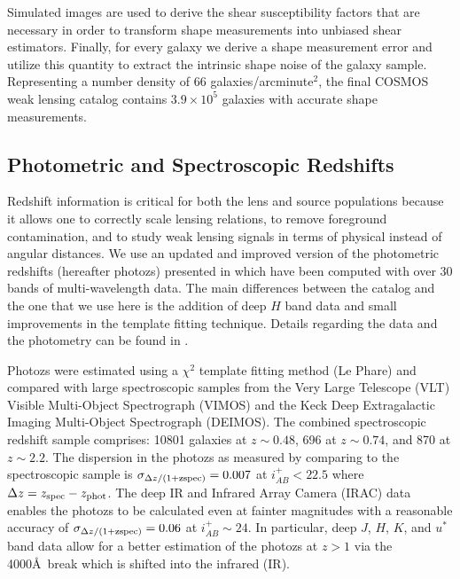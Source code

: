 \documentclass[12pt]{emulateapj}
\begin{document}
Simulated images are used to derive the shear susceptibility factors
that are necessary in order to transform shape measurements into
unbiased shear estimators. Finally, for every galaxy we derive a shape
measurement error and utilize this quantity to extract the intrinsic
shape noise of the galaxy sample.  Representing a number density of
$66$ galaxies/arcminute$^{2}$, the final COSMOS weak lensing catalog
contains $3.9 \times 10^5$ galaxies with accurate shape measurements.

\subsection{Photometric and Spectroscopic Redshifts}\label{photoz}

Redshift information is critical for both the lens and source
populations because it allows one to correctly scale lensing
relations, to remove foreground contamination, and to study weak
lensing signals in terms of physical instead of angular distances. We
use an updated and improved version of the photometric redshifts
(hereafter photozs) presented in \citet{Ilbert:2009} which have been
computed with over 30 bands of multi-wavelength data. The main
differences between the \citet{Ilbert:2009} catalog and the one that
we use here is the addition of deep $H$ band data and small
improvements in the template fitting technique. Details regarding the
data and the photometry can be found in \citet{Capak:2007}.

Photozs were estimated using a $\chi^2$ template fitting method (Le
Phare) and compared with large spectroscopic samples from the Very
Large Telescope (VLT) Visible Multi-Object Spectrograph (VIMOS)
\citep[][]{Lilly:2007} and the Keck Deep Extragalactic Imaging
Multi-Object Spectrograph (DEIMOS). The combined spectroscopic
redshift sample comprises: 10801 galaxies at $z\sim0.48$, 696 at
$z\sim 0.74$, and 870 at $z\sim 2.2$. The dispersion in the photozs as
measured by comparing to the spectroscopic sample is $\sigma_{\Delta
  z/(1+{\rm zspec})}=0.007$ at $i^{+}_{AB}<22.5$ where $\Delta z =
z_{\rm spec} - z_{\rm phot}$.  The deep IR and Infrared Array Camera
(IRAC) data enables the photozs to be calculated even at fainter
magnitudes with a reasonable accuracy of $\sigma_{\Delta z/(1+{\rm
    zspec})}=0.06$ at $i^{+}_{AB} \sim 24$. In particular, deep $J$,
$H$, $K$, and $u^{*}$ band data allow for a better estimation of the
photozs at $z>1$ via the 4000\AA\ break which is shifted into the
infrared (IR).
\end{document}
